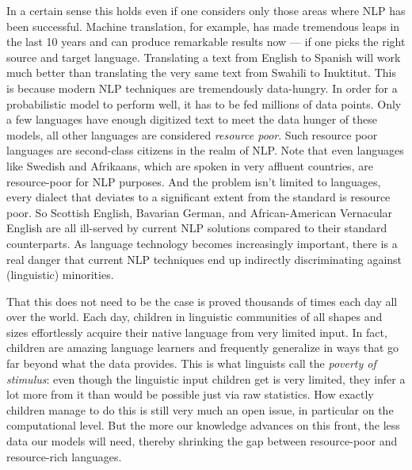 In a certain sense this holds even if one considers only those areas where NLP has been successful.
Machine translation, for example, has made tremendous leaps in the last 10 years and can produce remarkable results now --- if one picks the right source and target language.
Translating a text from English to Spanish will work much better than translating the very same text from Swahili to Inuktitut.
This is because modern NLP techniques are tremendously data-hungry.
In order for a probabilistic model to perform well, it has to be fed millions of data points.
Only a few languages have enough digitized text to meet the data hunger of these models, all other languages are considered \emph{resource poor}.
Such resource poor languages are second-class citizens in the realm of NLP\@.
Note that even languages like Swedish and Afrikaans, which are spoken in very affluent countries, are resource-poor for NLP purposes.
And the problem isn't limited to languages, every dialect that deviates to a significant extent from the standard is resource poor.
So Scottish English, Bavarian German, and African-American Vernacular English are all ill-served by current NLP solutions compared to their standard counterparts.
As language technology becomes increasingly important, there is a real danger that current NLP techniques end up indirectly discriminating against (linguistic) minorities.

That this does not need to be the case is proved thousands of times each day all over the world.
Each day, children in linguistic communities of all shapes and sizes effortlessly acquire their native language from very limited input.
In fact, children are amazing language learners and frequently generalize in ways that go far beyond what the data provides.
This is what linguists call the \emph{poverty of stimulus}: even though the linguistic input children get is very limited, they infer a lot more from it than would be possible just via raw statistics. 
How exactly children manage to do this is still very much an open issue, in particular on the computational level.
But the more our knowledge advances on this front, the less data our models will need, thereby shrinking the gap between resource-poor and resource-rich languages.

